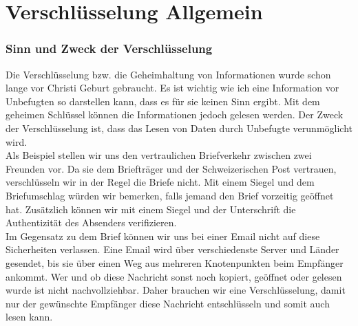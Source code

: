 \part{Verschlüsselung Allgemein}
\section{Sinn und Zweck der Verschlüsselung}
Die Verschlüsselung bzw. die Geheimhaltung von Informationen wurde schon lange vor Christi Geburt gebraucht. Es ist wichtig wie ich eine Information vor Unbefugten so darstellen kann, dass es für sie keinen Sinn ergibt. Mit dem geheimen Schlüssel können die Informationen jedoch gelesen werden. %
Der Zweck der Verschlüsselung ist, dass das Lesen von Daten durch Unbefugte verunmöglicht wird. \\
Als Beispiel stellen wir uns den vertraulichen Briefverkehr zwischen zwei Freunden vor. Da sie dem Briefträger und der Schweizerischen Post vertrauen, verschlüsseln wir in der Regel die Briefe nicht. Mit einem Siegel und dem Briefumschlag würden wir bemerken, falls jemand den Brief vorzeitig geöffnet hat. Zusätzlich können wir mit einem Siegel und der Unterschrift die Authentizität des Absenders verifizieren.\\
Im Gegensatz zu dem Brief können wir uns bei einer Email nicht auf diese Sicherheiten verlassen. Eine Email wird über verschiedenste Server und Länder gesendet, bis sie über einen Weg aus mehreren Knotenpunkten beim Empfänger ankommt. Wer und ob diese Nachricht sonst noch kopiert, geöffnet oder gelesen wurde ist nicht nachvollziehbar. Daher brauchen wir eine Verschlüsselung, damit nur der gewünschte Empfänger diese Nachricht entschlüsseln und somit auch lesen kann.
%
%

